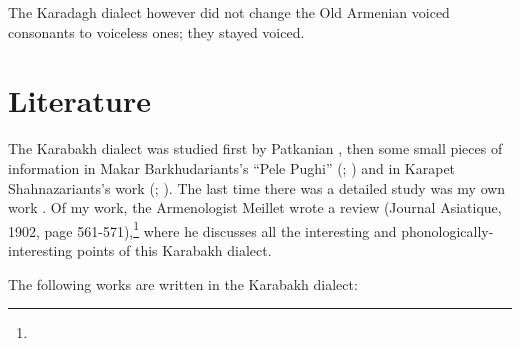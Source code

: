 The Karadagh dialect however did not change the Old Armenian voiced consonants to voiceless ones; they stayed voiced. 

\section{Literature}

The Karabakh dialect was studied first by Patkanian \citep[55-73]{Patkanian-1869-RussianDialects}, then some small pieces of information in Makar Barkhudariants's ``Pele Pughi'' (; ) and in Karapet Shahnazariants's work (; ). The last time there was a detailed study was my own work     \citep{Adjarian-1901-Kharabagh}. Of my work, the Armenologist Meillet wrote a review (Journal Asiatique, 1902, page 561-571),\footnote{} where he discusses all the interesting and phonologically-interesting points of this Karabakh dialect. 

The following works are written in the Karabakh dialect:

{\litoverview}

